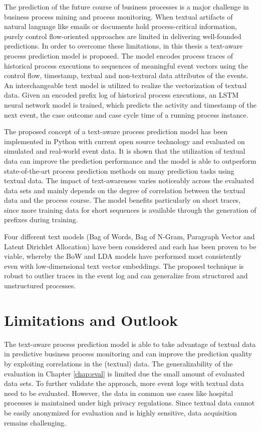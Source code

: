 The prediction of the future course of business processes is a major challenge in business process mining and process monitoring.
When textual artifacts of natural language like emails or documents hold process-critical information, purely control flow-oriented approaches are limited in delivering well-founded predictions.
In order to overcome these limitations, in this thesis a text-aware process prediction model is proposed.
The model encodes process traces of historical process executions to sequences of meaningful event vectors using the control flow, timestamp, textual and non-textural data attributes of the events.
An interchangeable text model is utilized to realize the vectorization of textual data.
Given an encoded prefix log of historical process executions, an LSTM neural network model is trained, which predicts the activity and timestamp of the next event, the case outcome and case cycle time of a running process instance.

The proposed concept of a text-aware process prediction model has been implemented in Python with current open source technology and evaluated on simulated and real-world event data.
It is shown that the utilization of textual data can improve the prediction performance and the model is able to outperform state-of-the-art process prediction methods on many prediction tasks using textual data.
The impact of text-awareness varies noticeably across the evaluated data sets and mainly depends on the degree of correlation between the textual data and the process course.
The model benefits particularly on short traces, since more training data for short sequences is available through the generation of prefixes during training.

Four different text models (Bag of Words, Bag of N-Gram, Paragraph Vector and Latent Dirichlet Allocation) have been considered and each has been proven to be viable, whereby the BoW and LDA models have performed most consistently even with low-dimensional text vector embeddings.
The proposed technique is robust to outlier traces in the event log and can generalize from structured and unstructured processes.

\section{Limitations and Outlook}

The text-aware process prediction model is able to take advantage of textual data in predictive business process monitoring and can improve the prediction quality by exploiting correlations in the (textual) data.
The generalizability of the evaluation in Chapter \ref{chap:eval} is limited due the small amount of evaluated data sets.
To further validate the approach, more event logs with textual data need to be evaluated.
However, the data in common use cases like hospital processes is maintained under high privacy regulations.
Since textual data cannot be easily anonymized for evaluation and is highly sensitive, data acquisition remains challenging.

